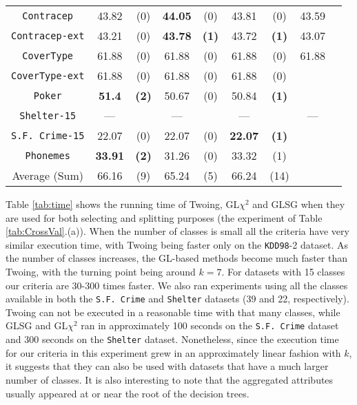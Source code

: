 \begin{table}
\begin{tabular}{c|cc|cc|cc|cc}
{\tt Contracep}     &43.82       &  (0)              &   {\bf 44.05}& (0)             &  43.81      &  (0)                 & 43.59       &                \\
{\tt Contracep-ext} &43.21       &  (0)              &   {\bf 43.78}& {\bf (1)}       &  43.72      &  {\bf (1)}           & 43.07       &                \\
{\tt CoverType}     &61.88       &  (0)              &   61.88      & (0)             &  61.88      &  (0)                 & 61.88       &                \\
{\tt CoverType-ext} &61.88       &  (0)              &   61.88      & (0)             &  61.88      &  (0)                 &             &                \\
{\tt Poker}         &{\bf 51.4}  &  {\bf (2)}        &   50.67      & (0)             &  50.84      &  {\bf (1)}           &             &                \\
{\tt Shelter-15}    &---         &                   &   ---        &                 &   ---       &                      & ---         &                \\
{\tt S.F. Crime-15} &22.07       &  (0)              &  22.07       & (0)             & {\bf 22.07} &  {\bf (1)}           &             &                \\
{\tt Phonemes}      & {\bf 33.91}&  {\bf (2)}        & 31.26        & (0)             &  33.32      &  (1)                 &             &                \\
\hline
Average (Sum)       & 66.16      &  (9)              & 65.24        & (5)             &  66.24      & (14)                 &             &
       \end{tabular}
\normalsize
\label{tab:CrossVal-b}
\end{table}


Table \ref{tab:time} shows the running time of Twoing, GL$\chi^2$ and GLSG  when
they are used for both selecting and splitting purposes (the experiment of Table \ref{tab:CrossVal}.(a)).
When the number of classes is small all the criteria have very similar execution time, with Twoing being faster only on the {\tt KDD98}-2 dataset. As the number of classes increases, the GL-based methods become much faster than Twoing, with the turning point being around $k=7$. For datasets with 15 classes our criteria are 30-300 times faster. We also ran experiments using all the classes available in both the {\tt S.F. Crime} and {\tt Shelter} datasets (39 and 22, respectively). Twoing can not be executed in a reasonable time with that many classes, while GLSG and GL$\chi^2$ ran in approximately 100 seconds on the {\tt S.F. Crime} dataset and  300 seconds on the {\tt Shelter} dataset. Nonetheless, since the execution time for our criteria in this experiment grew in an approximately linear fashion with $k$, it suggests that they can also be used with datasets that have a much larger number of classes. It is also interesting to note that the aggregated attributes usually appeared at or near the root of the decision trees.


